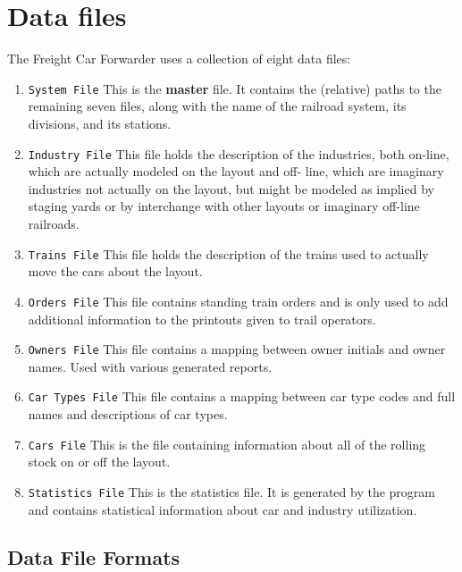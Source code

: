 \section{Data files}
\label{sect:fcf:Files}

The Freight Car Forwarder uses a collection of eight data files:

\begin{enumerate}
\item \verb=System File= This is the \textbf{master} file.  It contains the
(relative) paths to the remaining seven files, along with the name of
the railroad system, its divisions, and its stations.

\item \verb=Industry File= This file holds the description of the
industries, both on-line, which are actually modeled on the layout and
off- line, which are imaginary industries not actually on the layout,
but might be modeled as implied by staging yards or by interchange with
other layouts or imaginary off-line railroads.

\item \verb=Trains File= This file holds the description of the trains used
to actually move the cars about the layout.

\item \verb=Orders File= This file contains standing train orders and is
only used to add additional information to the printouts given to trail
operators.

\item \verb=Owners File= This file contains a mapping between owner initials
and owner names.  Used with various generated reports.

\item \verb=Car Types File= This file contains a mapping between car type
codes and full names and descriptions of car types.

\item \verb=Cars File= This is the file containing information about all of
the rolling stock on or off the layout.

\item \verb=Statistics File= This is the statistics file.  It is generated
by the program and contains statistical information about car and
industry utilization.
\end{enumerate}


\subsection{Data File Formats}
\label{sect:fcf:File Formats}

